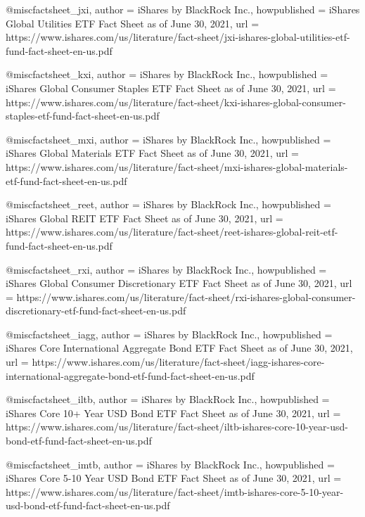 @misc{factsheet_jxi,
  author        = {iShares by BlackRock Inc.},
  howpublished  = {iShares Global Utilities ETF Fact Sheet as of June 30, 2021},
  url           = {https://www.ishares.com/us/literature/fact-sheet/jxi-ishares-global-utilities-etf-fund-fact-sheet-en-us.pdf}
}

@misc{factsheet_kxi,
  author        = {iShares by BlackRock Inc.},
  howpublished  = {iShares Global Consumer Staples ETF Fact Sheet as of June 30, 2021},
  url           = {https://www.ishares.com/us/literature/fact-sheet/kxi-ishares-global-consumer-staples-etf-fund-fact-sheet-en-us.pdf}
}

@misc{factsheet_mxi,
  author        = {iShares by BlackRock Inc.},
  howpublished  = {iShares Global Materials ETF Fact Sheet as of June 30, 2021},
  url           = {https://www.ishares.com/us/literature/fact-sheet/mxi-ishares-global-materials-etf-fund-fact-sheet-en-us.pdf}
}

@misc{factsheet_reet,
  author        = {iShares by BlackRock Inc.},
  howpublished  = {iShares Global REIT ETF Fact Sheet as of June 30, 2021},
  url           = {https://www.ishares.com/us/literature/fact-sheet/reet-ishares-global-reit-etf-fund-fact-sheet-en-us.pdf}
}

@misc{factsheet_rxi,
  author        = {iShares by BlackRock Inc.},
  howpublished  = {iShares Global Consumer Discretionary ETF Fact Sheet as of June 30, 2021},
  url           = {https://www.ishares.com/us/literature/fact-sheet/rxi-ishares-global-consumer-discretionary-etf-fund-fact-sheet-en-us.pdf}
}

@misc{factsheet_iagg,
  author        = {iShares by BlackRock Inc.},
  howpublished  = {iShares Core International Aggregate Bond ETF Fact Sheet as of June 30, 2021},
  url           = {https://www.ishares.com/us/literature/fact-sheet/iagg-ishares-core-international-aggregate-bond-etf-fund-fact-sheet-en-us.pdf}
}

@misc{factsheet_iltb,
  author        = {iShares by BlackRock Inc.},
  howpublished  = {iShares Core 10+ Year USD Bond ETF Fact Sheet as of June 30, 2021},
  url           = {https://www.ishares.com/us/literature/fact-sheet/iltb-ishares-core-10-year-usd-bond-etf-fund-fact-sheet-en-us.pdf}
}

@misc{factsheet_imtb,
  author        = {iShares by BlackRock Inc.},
  howpublished  = {iShares Core 5-10 Year USD Bond ETF Fact Sheet as of June 30, 2021},
  url           = {https://www.ishares.com/us/literature/fact-sheet/imtb-ishares-core-5-10-year-usd-bond-etf-fund-fact-sheet-en-us.pdf}
}

